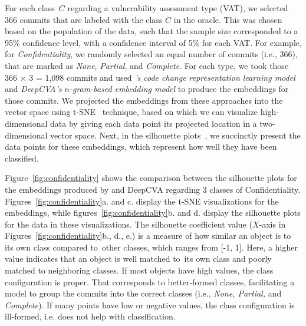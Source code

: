 For each class~$C$ regarding a vulnerability assessment type (VAT), we
selected 366 commits that are labeled with the class $C$ in the
oracle. This was chosen based on the population of the data, such that the sample size corresponded to a 95\% confidence level, with a confidence interval of 5\% for each VAT. 
For example, for {\em Confidentiality}, we randomly selected
an equal number of commits (i.e., 366), that are marked as {\em None}, {\em Partial}, and {\em Complete}.
For each type, we took those 366 $\times$ 3 = 1,098 commits and used
{\em {\tool}'s code change representation learning model} and {\em DeepCVA's
$n$-gram-based embedding model} to produce the embeddings for
those commits.  We projected the embeddings from these approaches
into the vector space using t-SNE~\cite{tsne} technique, based on which we can visualize high-dimensional data by giving
each data point its projected location in a two-dimensional vector
space. Next, in the silhouette plots~\cite{silhouette-plot}, we succinctly present the data points for these embeddings, which represent how well they have
been classified.

Figure~\ref{fig:confidentiality} shows the comparison between the
silhouette plots for the embeddings produced by {\tool} and DeepCVA
regarding 3 classes of
Confidentiality. Figures~\ref{fig:confidentiality}a. and c. display
the t-SNE visualizations for the embeddings, while
figures~\ref{fig:confidentiality}b. and d. display the silhouette
plots for the data in these visualizations.
The silhouette coefficient value ($X$-axis in
Figures~\ref{fig:confidentiality}b., d., e.) is a measure of how
similar an object is to its own class compared to~other classes, which ranges from [-1, 1]. Here, a higher value
indicates that an object is well matched to~its own class and poorly
matched to neighboring classes. If most objects have high values, the
class configuration is proper. That corresponds
to better-formed classes, facilitating a model to group the commits
into the correct classes (i.e., {\em None, Partial,} and {\em Complete}).
If many points have low or negative values, the
class configuration is ill-formed, i.e. does not help with
classification.

